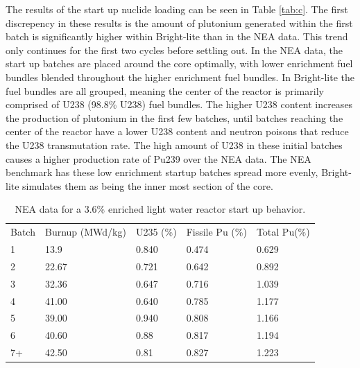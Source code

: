 \documentclass{article}
\begin{document}
The results of the start up nuclide loading can be seen in Table \ref{tab:c}.
The first discrepency in these results is the amount of plutonium generated
within the first batch is significantly higher within Bright-lite than in the NEA data.
This trend only continues for the first two cycles before settling out. In the NEA data, the start up batches 
are placed around the core optimally, with lower enrichment fuel bundles blended throughout the 
higher enrichment fuel bundles. In Bright-lite the fuel bundles are all grouped, meaning the center of 
the reactor is primarily comprised of U238 (98.8\% U238) fuel bundles. The higher U238 content
increases the production of plutonium in the first few batches, until batches reaching the center of
the reactor have a lower U238 content and neutron poisons that reduce the U238 transmutation 
rate. 
The high amount of U238 in these initial batches causes a higher production rate of
Pu239 over the NEA data. The NEA benchmark has these low enrichment startup batches
spread more evenly, Bright-lite simulates them as being the inner most section of the core.

\begin{table}[!htb]
\centering
\caption{NEA data for a 3.6\% enriched light water reactor start up behavior.}
\label{tab:d}
\begin{tabular}{lllll}
Batch & Burnup (MWd/kg) & U235 (\%) & Fissile Pu (\%) & Total Pu(\%) \\
1 & 13.9 & 0.840 & 0.474 & 0.629 \\
2 & 22.67 & 0.721 & 0.642 & 0.892 \\
3 & 32.36 & 0.647 & 0.716 & 1.039 \\
4 & 41.00 & 0.640 & 0.785 & 1.177 \\
5 & 39.00 & 0.940 & 0.808 & 1.166 \\
6 & 40.60 & 0.88 & 0.817 & 1.194 \\
7+ & 42.50 & 0.81 & 0.827 & 1.223
\end{tabular}
\end{table}
\end{document}
